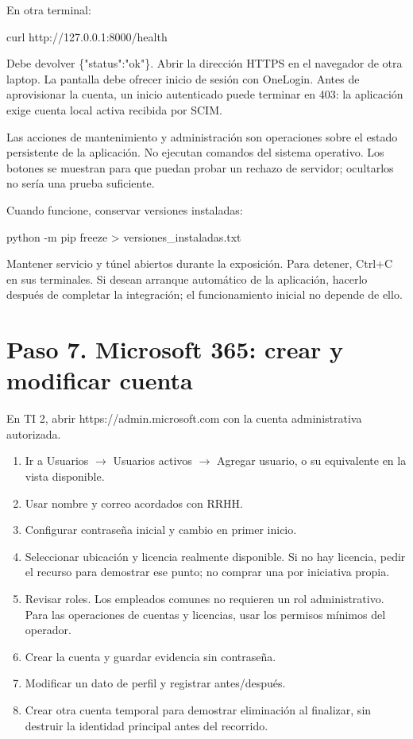 \documentclass[12pt,a4paper]{article}
\begin{document}
En otra terminal:\par
{}
\begin{Comandos}
curl http://127.0.0.1:8000/health
\end{Comandos}
Debe devolver \textnormal{\{"status":"ok"\}}. Abrir la dirección HTTPS en el navegador de otra laptop. La pantalla debe ofrecer inicio de sesión con OneLogin. Antes de aprovisionar la cuenta, un inicio autenticado puede terminar en 403: la aplicación exige cuenta local activa recibida por SCIM.\par
Las acciones de mantenimiento y administración son operaciones sobre el estado persistente de la aplicación. No ejecutan comandos del sistema operativo. Los botones se muestran para que puedan probar un rechazo de servidor; ocultarlos no sería una prueba suficiente.\par
Cuando funcione, conservar versiones instaladas:\par
{}
\begin{Comandos}
python -m pip freeze > versiones_instaladas.txt
\end{Comandos}
Mantener servicio y túnel abiertos durante la exposición. Para detener, Ctrl+C en sus terminales. Si desean arranque automático de la aplicación, hacerlo después de completar la integración; el funcionamiento inicial no depende de ello.\par
{}\section*{Paso 7. Microsoft 365: crear y modificar cuenta}
En TI 2, abrir \textnormal{https:/\allowbreak{}/\allowbreak{}admin.microsoft.com} con la cuenta administrativa autorizada.\par
\begin{enumerate}
\item Ir a Usuarios \(\rightarrow\) Usuarios activos \(\rightarrow\) Agregar usuario, o su equivalente en la vista disponible.
\item Usar nombre y correo acordados con RRHH.
\item Configurar contraseña inicial y cambio en primer inicio.
\item Seleccionar ubicación y licencia realmente disponible. Si no hay licencia, pedir el recurso para demostrar ese punto; no comprar una por iniciativa propia.
\item Revisar roles. Los empleados comunes no requieren un rol administrativo. Para las operaciones de cuentas y licencias, usar los permisos mínimos del operador.
\item Crear la cuenta y guardar evidencia sin contraseña.
\item Modificar un dato de perfil y registrar antes/después.
\item Crear otra cuenta temporal para demostrar eliminación al finalizar, sin destruir la identidad principal antes del recorrido.
\end{enumerate}
\end{document}
